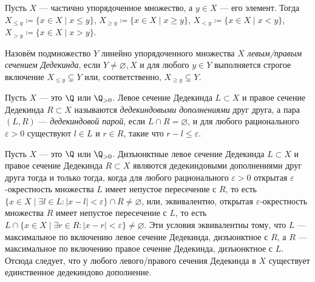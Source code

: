 \documentclass[
	extrafontsizes,
	11pt,
	hyphens,
]{memoir}
\begin{document}
\begin{notation}
Пусть \(X\) --- частично упорядоченное множество,
а \(y \in X\) --- его элемент.
Тогда \(X_{\leq y} \coloneqq \{x \in X \mid x \leq y\}\), \(X_{\geq y} \coloneqq \{x \in X \mid x \geq y\}\), \(X_{< y} \coloneqq \{x \in X \mid x < y\}\), \(X_{> y} \coloneqq \{x \in X \mid x > y\}\).
\end{notation}

\begin{definition}
Назовём подмножество \(Y\) линейно упорядоченного множества \(X\) \emph{левым/правым сечением Дедекинда}, если
\(Y \neq \varnothing, X\) и
для любого \(y \in Y\)
выполняется строгое включение
\(X_{\leq y} \varsubsetneq Y\)
или, соответственно,
\(X_{\geq y} \varsubsetneq Y\).
\end{definition}

\begin{definition}
Пусть \(X\) --- это \(\Q\) или \(\Q_{>0}\).
Левое сечение Дедекинда \(L \subset X\) и правое сечение Дедекинда \(R \subset X\) называются \emph{дедекиндовыми дополнениями} друг друга, а пара \((L,R)\) --- \emph{дедекиндовой парой}, если \(L \cap R = \varnothing\), и для любого рационального \(\varepsilon > 0\) существуют \(l \in L\) и \(r \in R\), такие что \(r - l \leq \varepsilon\).
\end{definition}

\begin{observation}
Пусть \(X\) --- это \(\Q\) или \(\Q_{>0}\).
Дизъюнктные левое сечение Дедекинда \(L \subset X\) и правое сечение Дедекинда \(R \subset X\) являются дедекиндовыми дополнениями друг друга тогда и только тогда, когда для любого рационального \(\varepsilon > 0\) открытая \(\varepsilon\)-окрестность множества \(L\) имеет непустое пересечение с \(R\),
то есть
\(\{x \in X \mid \exists l \in L : |x-l| < \varepsilon\} \cap R \neq \varnothing\),
или, эквивалентно,
открытая \(\varepsilon\)-окрестность множества \(R\) имеет непустое пересечение с \(L\),
то есть
\(L \cap \{x \in X \mid \exists r \in R : |x-r| < \varepsilon\} \neq \varnothing\).
Эти условия эквивалентны тому, что \(L\) --- максимальное по включению левое сечение Дедекинда, дизъюнктное с \(R\), а \(R\) --- максимальное по включению правое сечение Дедекинда, дизъюнктное с \(L\).
Отсюда следует, что у любого ле\-во\-го/пра\-во\-го сечения Дедекинда в \(X\) существует единственное дедекиндово дополнение.
\end{observation}
\end{document}
